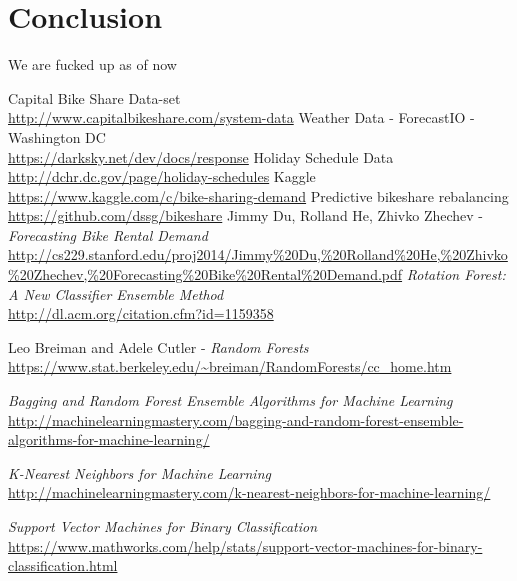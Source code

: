 \documentclass[journal, a4paper]{IEEEtran}
\begin{document}
\section{Conclusion}
We are fucked up as of now

\begin{thebibliography}{5}
    Capital Bike Share Data-set\\
    \url{http://www.capitalbikeshare.com/system-data}
    Weather Data - ForecastIO - Washington DC\\
    \url{https://darksky.net/dev/docs/response}
    Holiday Schedule Data\\
    \url{http://dchr.dc.gov/page/holiday-schedules}
    Kaggle\\
    \url{https://www.kaggle.com/c/bike-sharing-demand}
    Predictive bikeshare rebalancing\\
    \url{https://github.com/dssg/bikeshare}
    Jimmy Du, Rolland He, Zhivko Zhechev - \textit{Forecasting Bike Rental Demand}\\
    \url{http://cs229.stanford.edu/proj2014/Jimmy\%20Du,\%20Rolland\%20He,\%20Zhivko\%20Zhechev,\%20Forecasting\%20Bike\%20Rental\%20Demand.pdf}
    \textit{Rotation Forest: A New Classifier Ensemble Method} \\  
    \url{http://dl.acm.org/citation.cfm?id=1159358}
    
    Leo Breiman and Adele Cutler - \textit{Random Forests}
    \url{https://www.stat.berkeley.edu/~breiman/RandomForests/cc_home.htm}
    
    \textit{Bagging and Random Forest Ensemble Algorithms for Machine Learning} \\
    \url{http://machinelearningmastery.com/bagging-and-random-forest-ensemble-algorithms-for-machine-learning/}
    
    \textit{K-Nearest Neighbors for Machine Learning} \\
    \url{http://machinelearningmastery.com/k-nearest-neighbors-for-machine-learning/}
    
    \textit{Support Vector Machines for Binary Classification}\\
    \url{https://www.mathworks.com/help/stats/support-vector-machines-for-binary-classification.html}
    

\end{thebibliography}
\end{document}

